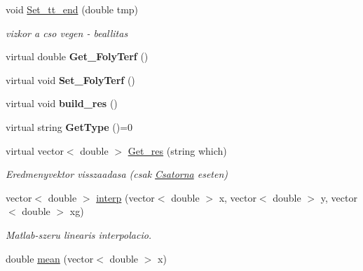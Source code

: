 \begin{DoxyCompactItemize}
\hypertarget{class_agelem_a9ff9bdd8cfd642c697cde656576315a6}{}\label{class_agelem_a9ff9bdd8cfd642c697cde656576315a6} 
void \hyperlink{class_agelem_a9ff9bdd8cfd642c697cde656576315a6}{Set\+\_\+tt\+\_\+end} (double tmp)
\begin{DoxyCompactList}\small\item\em vizkor a cso vegen -\/ beallitas \end{DoxyCompactList}\item 
\hypertarget{class_agelem_a0b858ef17c27b14b60c29404be67e486}{}\label{class_agelem_a0b858ef17c27b14b60c29404be67e486} 
virtual double {\bfseries Get\+\_\+\+Foly\+Terf} ()
\item 
\hypertarget{class_agelem_a52bbebe64a09fb4e96e870cd7dfc5fc7}{}\label{class_agelem_a52bbebe64a09fb4e96e870cd7dfc5fc7} 
virtual void {\bfseries Set\+\_\+\+Foly\+Terf} ()
\item 
\hypertarget{class_agelem_ac79eb4da65122b22558f66b8e4e8231b}{}\label{class_agelem_ac79eb4da65122b22558f66b8e4e8231b} 
virtual void {\bfseries build\+\_\+res} ()
\item 
\hypertarget{class_agelem_a0b648fe896fb1c2abdbb30023ddb3f5d}{}\label{class_agelem_a0b648fe896fb1c2abdbb30023ddb3f5d} 
virtual string {\bfseries Get\+Type} ()=0
\item 
\hypertarget{class_agelem_ad31d35680f3bb4941f4a68d6f208a2d7}{}\label{class_agelem_ad31d35680f3bb4941f4a68d6f208a2d7} 
virtual vector$<$ double $>$ \hyperlink{class_agelem_ad31d35680f3bb4941f4a68d6f208a2d7}{Get\+\_\+res} (string which)
\begin{DoxyCompactList}\small\item\em Eredmenyvektor visszaadasa (csak \hyperlink{class_csatorna}{Csatorna} eseten) \end{DoxyCompactList}\item 
\hypertarget{class_agelem_a2bf7db59960759d324cbef9632ca7df8}{}\label{class_agelem_a2bf7db59960759d324cbef9632ca7df8} 
vector$<$ double $>$ \hyperlink{class_agelem_a2bf7db59960759d324cbef9632ca7df8}{interp} (vector$<$ double $>$ x, vector$<$ double $>$ y, vector$<$ double $>$ xg)
\begin{DoxyCompactList}\small\item\em Matlab-\/szeru linearis interpolacio. \end{DoxyCompactList}\item 
\hypertarget{class_agelem_a126c41d23c78c6d5a81feafd6829e236}{}\label{class_agelem_a126c41d23c78c6d5a81feafd6829e236} 
double \hyperlink{class_agelem_a126c41d23c78c6d5a81feafd6829e236}{mean} (vector$<$ double $>$ x)

\end{DoxyCompactItemize}
